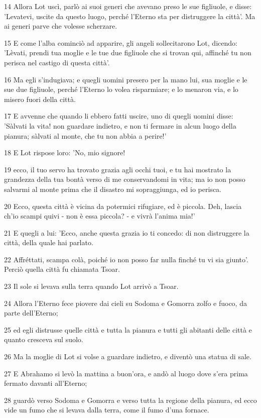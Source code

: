 \par 14 Allora Lot uscì, parlò ai suoi generi che avevano preso le sue figliuole, e disse: 'Levatevi, uscite da questo luogo, perché l'Eterno sta per distruggere la città'. Ma ai generi parve che volesse scherzare.
\par 15 E come l'alba cominciò ad apparire, gli angeli sollecitarono Lot, dicendo: 'Lèvati, prendi tua moglie e le tue due figliuole che si trovan qui, affinché tu non perisca nel castigo di questa città'.
\par 16 Ma egli s'indugiava; e quegli uomini presero per la mano lui, sua moglie e le sue due figliuole, perché l'Eterno lo volea risparmiare; e lo menaron via, e lo misero fuori della città.
\par 17 E avvenne che quando li ebbero fatti uscire, uno di quegli uomini disse: 'Sàlvati la vita! non guardare indietro, e non ti fermare in alcun luogo della pianura; sàlvati al monte, che tu non abbia a perire!'
\par 18 E Lot rispose loro: 'No, mio signore!
\par 19 ecco, il tuo servo ha trovato grazia agli occhi tuoi, e tu hai mostrato la grandezza della tua bontà verso di me conservandomi in vita; ma io non posso salvarmi al monte prima che il disastro mi sopraggiunga, ed io perisca.
\par 20 Ecco, questa città è vicina da potermici rifugiare, ed è piccola. Deh, lascia ch'io scampi quivi - non è essa piccola? - e vivrà l'anima mia!'
\par 21 E quegli a lui: 'Ecco, anche questa grazia io ti concedo: di non distruggere la città, della quale hai parlato.
\par 22 Affréttati, scampa colà, poiché io non posso far nulla finché tu vi sia giunto'. Perciò quella città fu chiamata Tsoar.
\par 23 Il sole si levava sulla terra quando Lot arrivò a Tsoar.
\par 24 Allora l'Eterno fece piovere dai cieli su Sodoma e Gomorra zolfo e fuoco, da parte dell'Eterno;
\par 25 ed egli distrusse quelle città e tutta la pianura e tutti gli abitanti delle città e quanto cresceva sul suolo.
\par 26 Ma la moglie di Lot si volse a guardare indietro, e diventò una statua di sale.
\par 27 E Abrahamo si levò la mattina a buon'ora, e andò al luogo dove s'era prima fermato davanti all'Eterno;
\par 28 guardò verso Sodoma e Gomorra e verso tutta la regione della pianura, ed ecco vide un fumo che si levava dalla terra, come il fumo d'una fornace.
